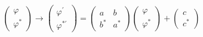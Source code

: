 \begin{equation} \left(
\begin{array}{l}
 \varphi \\
 \varphi^*
\end{array} \right)\rightarrow
\left(\begin{array}{l}
 \varphi^\prime \\
 \varphi^{* \prime}
\end{array} \right) =\left(
\begin{array}{ll}
  a & b  \\
  b^* & a^*
\end{array} \right)
\left(\begin{array}{l}
 \varphi \\
 \varphi^*
\end{array} \right)
+\left(\begin{array}{l}
 c \\
 c^*
\end{array} \right)
\label{T5}
\end{equation}

